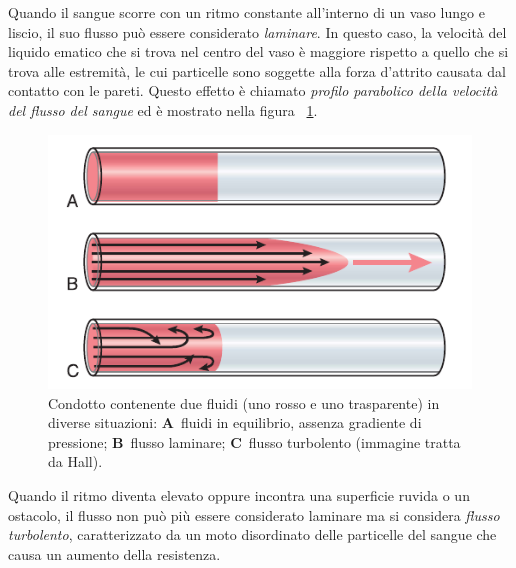 Quando il sangue scorre con un ritmo constante all'interno di un vaso lungo e liscio, il suo flusso può essere considerato \textit{laminare}. In questo caso, la velocità del liquido ematico che si trova nel centro del vaso è maggiore rispetto a quello che si trova alle estremità, le cui particelle sono soggette alla forza d'attrito causata dal contatto con le pareti. Questo effetto è chiamato \textit{profilo parabolico della velocità del flusso del sangue}\cite{Hall2016} ed è mostrato nella figura \Fig~\ref{fig:FlussoParabolico}.
\begin{figure}[b]
	\centering
	\includegraphics[width=0.6\linewidth]{ImageFiles/Fotopletismografia/FlussoParabolico}
	\caption{Condotto contenente due fluidi (uno rosso e uno trasparente) in diverse situazioni: \textbf{A}~fluidi in equilibrio, assenza gradiente di pressione; \textbf{B}~flusso laminare; \textbf{C}~flusso turbolento (immagine tratta da Hall\cite{Hall2016}).}
	\label{fig:FlussoParabolico}
\end{figure}
Quando il ritmo diventa elevato oppure incontra una superficie ruvida o un ostacolo, il flusso non può più essere considerato laminare ma si considera \textit{flusso turbolento}, caratterizzato da un moto disordinato delle particelle del sangue che causa un aumento della resistenza.

